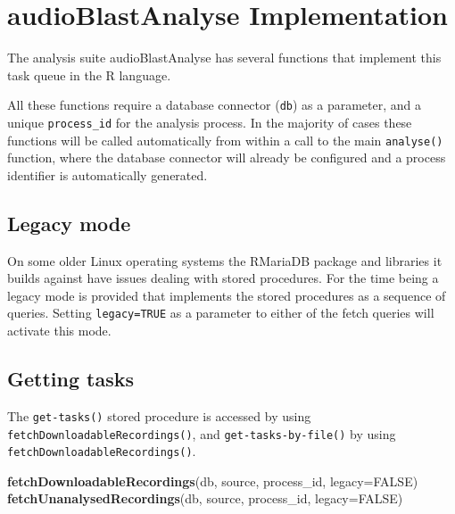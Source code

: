 \documentclass[
]{book}
\newenvironment{Shaded}{\begin{snugshade}}{\end{snugshade}}
\newcommand{\AttributeTok}[1]{\textcolor[rgb]{0.13,0.29,0.53}{#1}}
\newcommand{\ConstantTok}[1]{\textcolor[rgb]{0.56,0.35,0.01}{#1}}
\newcommand{\FunctionTok}[1]{\textcolor[rgb]{0.13,0.29,0.53}{\textbf{#1}}}
\newcommand{\NormalTok}[1]{#1}
\begin{document}
\hypertarget{audioblastanalyse-implementation}{%
\section{audioBlastAnalyse Implementation}\label{audioblastanalyse-implementation}}

The analysis suite audioBlastAnalyse has several functions that implement this task queue in the R language.

All these functions require a database connector (\texttt{db}) as a parameter, and a unique \texttt{process\_id} for the analysis process. In the majority of cases these functions will be called automatically from within a call to the main \texttt{analyse()} function, where the database connector will already be configured and a process identifier is automatically generated.

\hypertarget{legacy-mode}{%
\subsection{Legacy mode}\label{legacy-mode}}

On some older Linux operating systems the RMariaDB package and libraries it builds against have issues dealing with stored procedures. For the time being a legacy mode is provided that implements the stored procedures as a sequence of queries. Setting \texttt{legacy=TRUE} as a parameter to either of the fetch queries will activate this mode.

\hypertarget{getting-tasks}{%
\subsection{Getting tasks}\label{getting-tasks}}

The \texttt{get-tasks()} stored procedure is accessed by using \texttt{fetchDownloadableRecordings()}, and \texttt{get-tasks-by-file()} by using \texttt{fetchDownloadableRecordings()}.

\begin{Shaded}
\begin{Highlighting}[]
\FunctionTok{fetchDownloadableRecordings}\NormalTok{(db, source, process\_id, }\AttributeTok{legacy=}\ConstantTok{FALSE}\NormalTok{)}
\FunctionTok{fetchUnanalysedRecordings}\NormalTok{(db, source, process\_id, }\AttributeTok{legacy=}\ConstantTok{FALSE}\NormalTok{)}
\end{Highlighting}
\end{Shaded}
\end{document}

